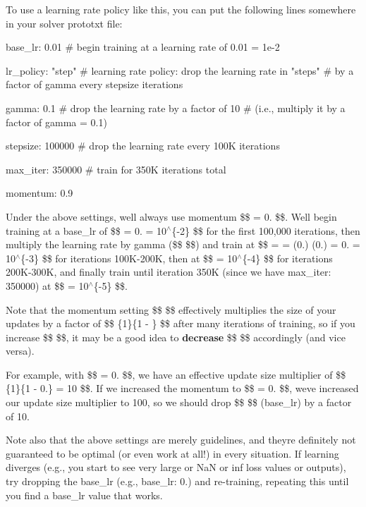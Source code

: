 To use a learning rate policy like this, you can put the following lines somewhere in your solver prototxt file\+: \begin{DoxyVerb}base_lr: 0.01     # begin training at a learning rate of 0.01 = 1e-2

lr_policy: "step" # learning rate policy: drop the learning rate in "steps"
                  # by a factor of gamma every stepsize iterations

gamma: 0.1        # drop the learning rate by a factor of 10
                  # (i.e., multiply it by a factor of gamma = 0.1)

stepsize: 100000  # drop the learning rate every 100K iterations

max_iter: 350000  # train for 350K iterations total

momentum: 0.9
\end{DoxyVerb}


Under the above settings, we\textquotesingle{}ll always use {\ttfamily momentum} \$\$  = 0. \$\$. We\textquotesingle{}ll begin training at a {\ttfamily base\+\_\+lr} of \$\$  = 0. = 10$^\wedge$\{-\/2\} \$\$ for the first 100,000 iterations, then multiply the learning rate by {\ttfamily gamma} (\$\$  \$\$) and train at \$\$ \textquotesingle{} =   = (0.) (0.) = 0. = 10$^\wedge$\{-\/3\} \$\$ for iterations 100\+K-\/200K, then at \$\$ \textquotesingle{}\textquotesingle{} = 10$^\wedge$\{-\/4\} \$\$ for iterations 200\+K-\/300K, and finally train until iteration 350K (since we have {\ttfamily max\+\_\+iter\+: 350000}) at \$\$ \textquotesingle{}\textquotesingle{}\textquotesingle{} = 10$^\wedge$\{-\/5\} \$\$.

Note that the momentum setting \$\$  \$\$ effectively multiplies the size of your updates by a factor of \$\$ \{1\}\{1 -\/ \} \$\$ after many iterations of training, so if you increase \$\$  \$\$, it may be a good idea to {\bfseries decrease} \$\$  \$\$ accordingly (and vice versa).

For example, with \$\$  = 0. \$\$, we have an effective update size multiplier of \$\$ \{1\}\{1 -\/ 0.\} = 10 \$\$. If we increased the momentum to \$\$  = 0. \$\$, we\textquotesingle{}ve increased our update size multiplier to 100, so we should drop \$\$  \$\$ ({\ttfamily base\+\_\+lr}) by a factor of 10.

Note also that the above settings are merely guidelines, and they\textquotesingle{}re definitely not guaranteed to be optimal (or even work at all!) in every situation. If learning diverges (e.\+g., you start to see very large or {\ttfamily NaN} or {\ttfamily inf} loss values or outputs), try dropping the {\ttfamily base\+\_\+lr} (e.\+g., {\ttfamily base\+\_\+lr\+: 0.}) and re-\/training, repeating this until you find a {\ttfamily base\+\_\+lr} value that works.

